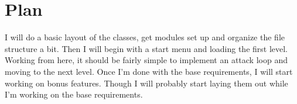 \documentclass{article}
\begin{document}
\section{Plan}
I will do a basic layout of the classes, get modules set up and organize the file structure a bit. Then I will begin with a start menu and loading the first level. Working from here, it should be fairly simple to implement an attack loop and moving to the next level. Once I'm done with the base requirements, I will start working on bonus features. Though I will probably start laying them out while I'm working on the base requirements.
\end{document}
